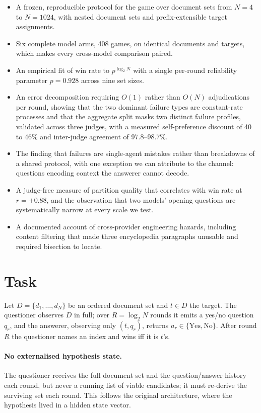 \documentclass[11pt]{article}
\begin{document}
\begin{itemize}
\item A frozen, reproducible protocol for the game over document sets from
$N=4$ to $N=1024$, with nested document sets and prefix-extensible target
assignments.
\item Six complete model arms, 408 games, on identical documents and targets,
which makes every cross-model comparison paired.
\item An empirical fit of win rate to $p^{\log_2 N}$ with a single per-round
reliability parameter $p=0.928$ across nine set sizes.
\item An error decomposition requiring $O(1)$ rather than $O(N)$ adjudications
per round, showing that the two dominant failure types are constant-rate
processes and that the aggregate split masks two distinct failure profiles, validated across three judges, with a measured
self-preference discount of 40 to 46\% and inter-judge agreement of
97.8--98.7\%.
\item The finding that failures are single-agent mistakes rather than
breakdowns of a shared protocol, with one exception we can attribute to the
channel: questions encoding context the answerer cannot decode.
\item A judge-free measure of partition quality that correlates with win rate at
$r=+0.88$, and the observation that two models' opening questions are
systematically narrow at every scale we test.
\item A documented account of cross-provider engineering hazards, including
content filtering that made three encyclopedia paragraphs unusable and required
bisection to locate.
\end{itemize}

\section{Task}
\label{sec:task}

Let $D = \{d_1,\dots,d_N\}$ be an ordered document set and $t \in D$ the target.
The questioner observes $D$ in full; over $R = \log_2 N$ rounds it emits a
yes/no question $q_r$, and the answerer, observing only $(t, q_r)$, returns
$a_r \in \{\text{Yes},\text{No}\}$. After round $R$ the questioner names an
index and wins iff it is $t$'s.

\paragraph{No externalised hypothesis state.} The questioner receives the full
document set and the question/answer history each round, but never a running
list of viable candidates; it must re-derive the surviving set each round. This
follows the original architecture, where the hypothesis lived in a hidden state
vector.
\end{document}
